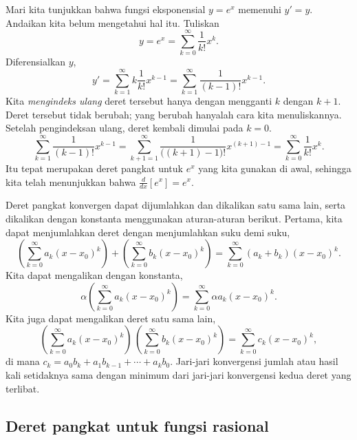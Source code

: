 \begin{example}
Mari kita tunjukkan bahwa fungsi eksponensial $y=e^x$ memenuhi $y'=y$. Andaikan
kita belum mengetahui hal itu.
Tuliskan
\begin{equation*}
y = e^x = \sum_{k=0}^\infty \frac{1}{k!} x^k .
\end{equation*}
Diferensialkan $y$,
\begin{equation*}
y' = \sum_{k=1}^\infty k \frac{1}{k!} x^{k-1} =
\sum_{k=1}^\infty \frac{1}{(k-1)!} x^{k-1} .
\end{equation*}
Kita \emph{mengindeks ulang}
deret tersebut hanya dengan mengganti $k$ dengan $k+1$. Deret tersebut
tidak berubah; yang berubah hanyalah cara kita menuliskannya. Setelah
pengindeksan ulang, deret kembali dimulai
pada $k=0$.
\begin{equation*}
\sum_{k=1}^\infty \frac{1}{(k-1)!} x^{k-1} =
\sum_{k+1=1}^\infty \frac{1}{\bigl((k+1)-1\bigr)!} x^{(k+1)-1} =
\sum_{k=0}^\infty \frac{1}{k!} x^k .
\end{equation*}
Itu tepat merupakan deret pangkat untuk $e^x$ yang kita gunakan di awal,
sehingga kita telah menunjukkan bahwa $\frac{d}{dx} [ e^x ] = e^x$.
\end{example}

Deret pangkat konvergen dapat dijumlahkan dan dikalikan satu sama lain, serta dikalikan
dengan konstanta menggunakan aturan-aturan berikut. Pertama, kita dapat menjumlahkan deret dengan
menjumlahkan suku demi suku,
\begin{equation*}
\left(\sum_{k=0}^\infty a_k {(x-x_0)}^k\right)
+
\left(\sum_{k=0}^\infty b_k {(x-x_0)}^k\right)
=
\sum_{k=0}^\infty (a_k+b_k) {(x-x_0)}^k .
\end{equation*}
Kita dapat mengalikan dengan konstanta,
\begin{equation*}
\alpha
\left(\sum_{k=0}^\infty a_k {(x-x_0)}^k\right)
=
\sum_{k=0}^\infty \alpha a_k {(x-x_0)}^k .
\end{equation*}
Kita juga dapat mengalikan deret satu sama lain,
\begin{equation*}
\left(\sum_{k=0}^\infty a_k {(x-x_0)}^k\right)
\,
\left(\sum_{k=0}^\infty b_k {(x-x_0)}^k\right)
=
\sum_{k=0}^\infty c_k {(x-x_0)}^k ,
\end{equation*}
di mana
$c_k = a_0b_k + a_1 b_{k-1} + \cdots + a_k b_0$.
Jari-jari konvergensi jumlah atau hasil kali
setidaknya sama dengan minimum dari jari-jari konvergensi
kedua deret yang terlibat.

\subsection{Deret pangkat untuk fungsi rasional}

